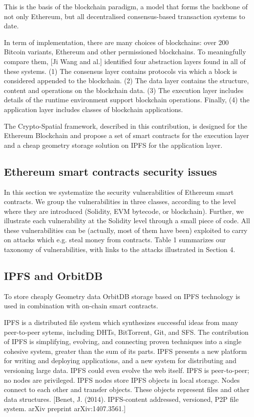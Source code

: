 \documentclass{isprs} %
\begin{document}
This is the basis of the blockchain paradigm, a model that forms the backbone of not only Ethereum, but all decentralised consensus-based transaction systems to date.

In term of implementation, there are many choices of blockchains: over 200 Bitcoin variants, Ethereum and other permissioned blockchains. To meaningfully compare them, [Ji Wang and al.] identified four abstraction layers found in all of these systems. (1) The consensus layer contains protocols via which a block is considered appended to the blockchain. (2) The data layer contains the structure, content and operations on the blockchain data. (3) The execution layer includes details of the runtime environment support blockchain operations. Finally, (4) the application layer includes classes of blockchain applications. 

The Crypto-Spatial framework, described in this contribution, is designed for the Ethereum Blockchain and propose a set of smart contracts for the execution layer and a cheap geometry storage solution on IPFS for the application layer.

\subsection{Ethereum smart contracts security issues}\label{sec:Ethereum smart contracts security issues}

In this section we systematize the security vulnerabilities of Ethereum smart
contracts. We group the vulnerabilities in three classes, according to the level
where they are introduced (Solidity, EVM bytecode, or blockchain). Further, we
illustrate each vulnerability at the Solidity level through a small piece of code.
All these vulnerabilities can be (actually, most of them have been) exploited to
carry on attacks which e.g. steal money from contracts. Table 1 summarizes our
taxonomy of vulnerabilities, with links to the attacks illustrated in Section 4.

\subsection{IPFS and OrbitDB}\label{sec:IPFS and OrbitDB}

To store cheaply Geometry data OrbitDB storage based on IPFS technology is used in combination with on-chain smart contracts.
 
IPFS is a distributed file system which synthesizes successful ideas from many peer-to-peer sytems, including DHTs, BitTorrent, Git, and SFS. The contribution of IPFS is simplifying, evolving, and connecting proven techniques into a single cohesive system, greater than the sum of its parts. IPFS presents a new platform for writing and deploying applications, and a new system for distributing and versioning large data. IPFS could even evolve the web itself. IPFS is peer-to-peer; no nodes are privileged. IPFS nodes store IPFS objects in local storage. Nodes connect to each other and transfer objects. These objects represent files and other data structures. [Benet, J. (2014). IPFS-content addressed, versioned, P2P file system. arXiv preprint arXiv:1407.3561.]
\end{document}
